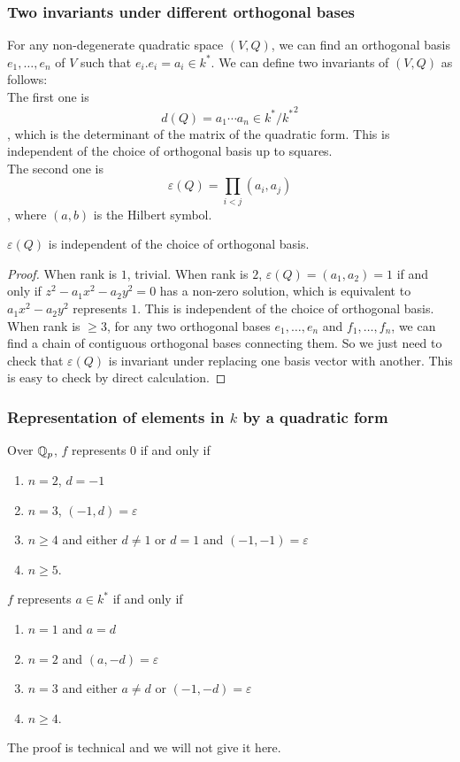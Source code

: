 \documentclass[15pt]{scrartcl}
\begin{document}
\subsubsection*{Two invariants under different orthogonal bases}
For any non-degenerate quadratic space $(V,Q)$, we can find an orthogonal basis $e_1,\ldots,e_n$ of $V$ such that $e_i.e_i=a_i\in k^*$. We can define two invariants of $(V,Q)$ as follows:
\\

The first one is \[d(Q)=a_1\cdots a_n\in k^*/{k^*}^2\], which is the determinant of the matrix of the quadratic form. This is independent of the choice of orthogonal basis up to squares.  
\\

The second one is \[\varepsilon(Q)=\prod_{i<j}(a_i,a_j)\], where $(a,b)$ is the Hilbert symbol. 
\begin{claim}
    $\varepsilon(Q)$ is independent of the choice of orthogonal basis.
\end{claim}
\begin{proof}
    When rank is $1$, trivial. When rank is $2$, $\varepsilon(Q)=(a_1,a_2)=1$ if and only if $z^2-a_1x^2-a_2y^2=0$ has a non-zero solution, which is equivalent to $a_1x^2-a_2y^2$ represents $1$. This is independent of the choice of orthogonal basis. When rank is $\geq 3$, for any two orthogonal bases $e_1,\ldots,e_n$ and $f_1,\ldots,f_n$, we can find a chain of contiguous orthogonal bases connecting them. So we just need to check that $\varepsilon(Q)$ is invariant under replacing one basis vector with another. This is easy to check by direct calculation.
\end{proof}

\subsubsection*{Representation of elements in $k$ by a quadratic form}
\begin{theorem}
    Over $\mathbb Q_p$, $f$ represents $0$ if and only if 
    \begin{enumerate}
        \item $n=2$, $d=-1$
        \item $n=3$, $(-1,d)=\varepsilon$
        \item $n\geq 4$ and either $d\neq 1$ or $d=1$ and $(-1,-1)=\varepsilon$
        \item $n\geq 5$. 
    \end{enumerate}
    $f$ represents $a\in k^*$ if and only if 
    \begin{enumerate}
        \item $n=1$ and $a=d$
        \item $n=2$ and $(a,-d)=\varepsilon$
        \item $n=3$ and either $a\neq d$ or $(-1, -d)=\varepsilon$
        \item $n\geq 4$. 
    \end{enumerate}
\end{theorem}
The proof is technical and we will not give it here. 
\end{document}
